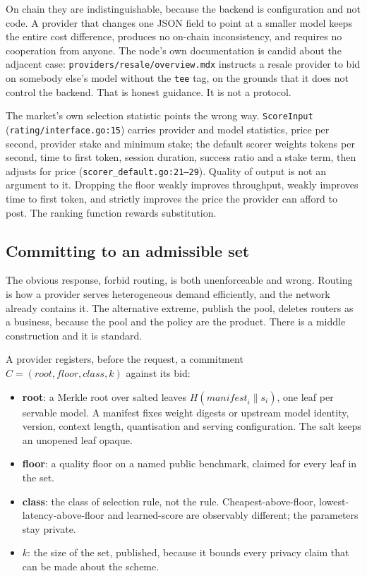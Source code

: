 \documentclass[11pt,a4paper]{article}
\newcommand{\code}[1]{\texttt{\small #1}}
\begin{document}
On chain they are indistinguishable, because the backend is configuration and
not code. A provider that changes one JSON field to point at a smaller model
keeps the entire cost difference, produces no on-chain inconsistency, and
requires no cooperation from anyone. The node's own documentation is candid
about the adjacent case: \code{providers/resale/overview.mdx} instructs a resale
provider to bid on somebody else's model without the \code{tee} tag, on the
grounds that it does not control the backend. That is honest guidance. It is not
a protocol.

The market's own selection statistic points the wrong way. \code{ScoreInput}
(\code{rating/interface.go:15}) carries provider and model statistics, price per
second, provider stake and minimum stake; the default scorer weights tokens per
second, time to first token, session duration, success ratio and a stake term,
then adjusts for price (\code{scorer\_default.go:21--29}). Quality of output is
not an argument to it. Dropping the floor weakly improves throughput, weakly
improves time to first token, and strictly improves the price the provider can
afford to post. The ranking function rewards substitution.

\subsection{Committing to an admissible set}
\label{sec:disclose}

The obvious response, forbid routing, is both unenforceable and wrong. Routing
is how a provider serves heterogeneous demand efficiently, and the network
already contains it. The alternative extreme, publish the pool, deletes routers
as a business, because the pool and the policy are the product. There is a
middle construction and it is standard.

A provider registers, before the request, a commitment
$C = (\textit{root}, \textit{floor}, \textit{class}, k)$ against its bid:

\begin{itemize}
\item \textbf{root}: a Merkle root over salted leaves
$H(\textit{manifest}_i \| s_i)$, one leaf per servable model. A manifest fixes
weight digests or upstream model identity, version, context length,
quantisation and serving configuration. The salt keeps an unopened leaf opaque.
\item \textbf{floor}: a quality floor on a named public benchmark, claimed for
every leaf in the set.
\item \textbf{class}: the class of selection rule, not the rule.
Cheapest-above-floor, lowest-latency-above-floor and learned-score are
observably different; the parameters stay private.
\item $k$: the size of the set, published, because it bounds every privacy
claim that can be made about the scheme.
\end{itemize}
\end{document}
